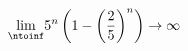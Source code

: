 
\begin{align}
    \lim_{\ntoinf} & 5^n \left( 1 - \left( \frac{2}{5} \right)^n \right) 
    \rightarrow \infty
\end{align}

\pagebreak
